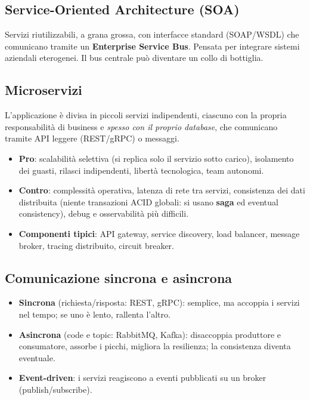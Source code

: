 \subsection{Service-Oriented Architecture (SOA)}
Servizi riutilizzabili, a grana grossa, con interfacce standard (SOAP/WSDL) che comunicano tramite un \textbf{Enterprise Service Bus}. Pensata per integrare sistemi aziendali eterogenei. Il bus centrale può diventare un collo di bottiglia.

\subsection{Microservizi}
L'applicazione è divisa in piccoli servizi indipendenti, ciascuno con la propria responsabilità di business e \emph{spesso con il proprio database}, che comunicano tramite API leggere (REST/gRPC) o messaggi.
\begin{itemize}
    \item \textbf{Pro}: scalabilità selettiva (si replica solo il servizio sotto carico), isolamento dei guasti, rilasci indipendenti, libertà tecnologica, team autonomi.
    \item \textbf{Contro}: complessità operativa, latenza di rete tra servizi, consistenza dei dati distribuita (niente transazioni ACID globali: si usano \textbf{saga} ed eventual consistency), debug e osservabilità più difficili.
    \item \textbf{Componenti tipici}: API gateway, service discovery, load balancer, message broker, tracing distribuito, circuit breaker.
\end{itemize}

\subsection{Comunicazione sincrona e asincrona}
\begin{itemize}
    \item \textbf{Sincrona} (richiesta/risposta: REST, gRPC): semplice, ma accoppia i servizi nel tempo; se uno è lento, rallenta l'altro.
    \item \textbf{Asincrona} (code e topic: RabbitMQ, Kafka): disaccoppia produttore e consumatore, assorbe i picchi, migliora la resilienza; la consistenza diventa eventuale.
    \item \textbf{Event-driven}: i servizi reagiscono a eventi pubblicati su un broker (publish/subscribe).
\end{itemize}

